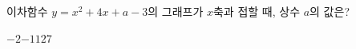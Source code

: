 이차함수 $y=x^2+4x+a-3$의 그래프가 $x$축과 접할 때, 상수 $a$의 값은?
\begin{choices32}{$-2$}{$-1$}{$1$}{$2$}{$7$}\end{choices32}
